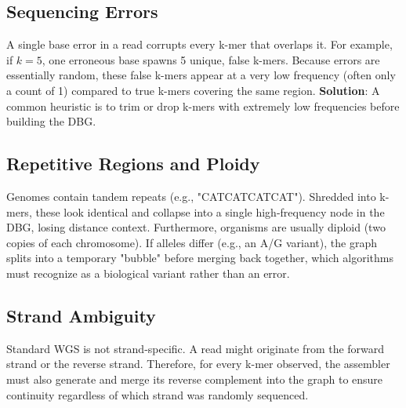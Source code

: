 \documentclass[11pt,a4paper]{article}
\begin{document}
\subsection{Sequencing Errors}
A single base error in a read corrupts every k-mer that overlaps it. For example, if $k=5$, one erroneous base spawns 5 unique, false k-mers. 
Because errors are essentially random, these false k-mers appear at a very low frequency (often only a count of 1) compared to true k-mers covering the same region.
\textbf{Solution}: A common heuristic is to trim or drop k-mers with extremely low frequencies before building the DBG.

\subsection{Repetitive Regions and Ploidy}
Genomes contain tandem repeats (e.g., "CATCATCATCAT"). Shredded into k-mers, these look identical and collapse into a single high-frequency node in the DBG, losing distance context.
Furthermore, organisms are usually diploid (two copies of each chromosome). If alleles differ (e.g., an A/G variant), the graph splits into a temporary "bubble" before merging back together, which algorithms must recognize as a biological variant rather than an error.

\subsection{Strand Ambiguity}
Standard WGS is not strand-specific. A read might originate from the forward strand or the reverse strand. Therefore, for every k-mer observed, the assembler must also generate and merge its reverse complement into the graph to ensure continuity regardless of which strand was randomly sequenced.
\end{document}
